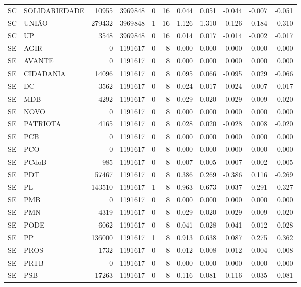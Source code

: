 \begin{landscape}
\begin{longtable}{llrrrrrrrrr}
SC & SOLIDARIEDADE & 10955 & 3969848 & 0 & 16 & 0.044 & 0.051 & -0.044 & -0.007 & -0.051 \\
SC & UNIÃO & 279432 & 3969848 & 1 & 16 & 1.126 & 1.310 & -0.126 & -0.184 & -0.310 \\
SC & UP & 3548 & 3969848 & 0 & 16 & 0.014 & 0.017 & -0.014 & -0.002 & -0.017 \\
SE & AGIR & 0 & 1191617 & 0 & 8 & 0.000 & 0.000 & 0.000 & 0.000 & 0.000 \\
SE & AVANTE & 0 & 1191617 & 0 & 8 & 0.000 & 0.000 & 0.000 & 0.000 & 0.000 \\
SE & CIDADANIA & 14096 & 1191617 & 0 & 8 & 0.095 & 0.066 & -0.095 & 0.029 & -0.066 \\
SE & DC & 3562 & 1191617 & 0 & 8 & 0.024 & 0.017 & -0.024 & 0.007 & -0.017 \\
SE & MDB & 4292 & 1191617 & 0 & 8 & 0.029 & 0.020 & -0.029 & 0.009 & -0.020 \\
SE & NOVO & 0 & 1191617 & 0 & 8 & 0.000 & 0.000 & 0.000 & 0.000 & 0.000 \\
SE & PATRIOTA & 4165 & 1191617 & 0 & 8 & 0.028 & 0.020 & -0.028 & 0.008 & -0.020 \\
SE & PCB & 0 & 1191617 & 0 & 8 & 0.000 & 0.000 & 0.000 & 0.000 & 0.000 \\
SE & PCO & 0 & 1191617 & 0 & 8 & 0.000 & 0.000 & 0.000 & 0.000 & 0.000 \\
SE & PCdoB & 985 & 1191617 & 0 & 8 & 0.007 & 0.005 & -0.007 & 0.002 & -0.005 \\
SE & PDT & 57467 & 1191617 & 0 & 8 & 0.386 & 0.269 & -0.386 & 0.116 & -0.269 \\
SE & PL & 143510 & 1191617 & 1 & 8 & 0.963 & 0.673 & 0.037 & 0.291 & 0.327 \\
SE & PMB & 0 & 1191617 & 0 & 8 & 0.000 & 0.000 & 0.000 & 0.000 & 0.000 \\
SE & PMN & 4319 & 1191617 & 0 & 8 & 0.029 & 0.020 & -0.029 & 0.009 & -0.020 \\
SE & PODE & 6062 & 1191617 & 0 & 8 & 0.041 & 0.028 & -0.041 & 0.012 & -0.028 \\
SE & PP & 136000 & 1191617 & 1 & 8 & 0.913 & 0.638 & 0.087 & 0.275 & 0.362 \\
SE & PROS & 1732 & 1191617 & 0 & 8 & 0.012 & 0.008 & -0.012 & 0.004 & -0.008 \\
SE & PRTB & 0 & 1191617 & 0 & 8 & 0.000 & 0.000 & 0.000 & 0.000 & 0.000 \\
SE & PSB & 17263 & 1191617 & 0 & 8 & 0.116 & 0.081 & -0.116 & 0.035 & -0.081 \\

\end{longtable}
\end{landscape}
